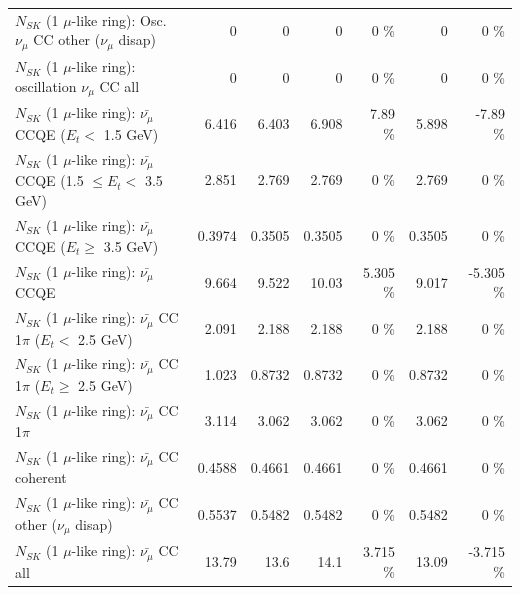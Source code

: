 \begin{table}
\begin{tabular}{| l | r | r | r  r | r  r |}
         $N_{SK}$ (1 $\mu$-like ring): Osc. $\nu_\mu$ CC other ($\nu_\mu$ disap) &               0 &               0 &               0 &        0 \%  &               0 &        0 \%  \\ 
                      $N_{SK}$ (1 $\mu$-like ring): oscillation $\nu_\mu$ CC all &               0 &               0 &               0 &        0 \%  &               0 &        0 \%  \\ 
\hline
\hline
          $N_{SK}$ (1 $\mu$-like ring): $\bar{\nu_\mu}$ CCQE ($E_{t} <$ 1.5 GeV) &           6.416 &           6.403 &           6.908 &     7.89 \%  &           5.898 &    -7.89 \%  \\ 
 $N_{SK}$ (1 $\mu$-like ring): $\bar{\nu_\mu}$ CCQE (1.5 $\leq E_{t} <$ 3.5 GeV) &           2.851 &           2.769 &           2.769 &        0 \%  &           2.769 &        0 \%  \\ 
       $N_{SK}$ (1 $\mu$-like ring): $\bar{\nu_\mu}$ CCQE ($E_{t} \geq$ 3.5 GeV) &          0.3974 &          0.3505 &          0.3505 &        0 \%  &          0.3505 &        0 \%  \\ 
\hline
                              $N_{SK}$ (1 $\mu$-like ring): $\bar{\nu_\mu}$ CCQE &           9.664 &           9.522 &           10.03 &    5.305 \%  &           9.017 &   -5.305 \%  \\ 
\hline
     $N_{SK}$ (1 $\mu$-like ring): $\bar{\nu_\mu}$ CC 1$\pi$ ($E_{t} <$ 2.5 GeV) &           2.091 &           2.188 &           2.188 &        0 \%  &           2.188 &        0 \%  \\ 
  $N_{SK}$ (1 $\mu$-like ring): $\bar{\nu_\mu}$ CC 1$\pi$ ($E_{t} \geq$ 2.5 GeV) &           1.023 &          0.8732 &          0.8732 &        0 \%  &          0.8732 &        0 \%  \\ 
\hline
                         $N_{SK}$ (1 $\mu$-like ring): $\bar{\nu_\mu}$ CC 1$\pi$ &           3.114 &           3.062 &           3.062 &        0 \%  &           3.062 &        0 \%  \\ 
                       $N_{SK}$ (1 $\mu$-like ring): $\bar{\nu_\mu}$ CC coherent &          0.4588 &          0.4661 &          0.4661 &        0 \%  &          0.4661 &        0 \%  \\ 
        $N_{SK}$ (1 $\mu$-like ring): $\bar{\nu_\mu}$ CC other ($\nu_\mu$ disap) &          0.5537 &          0.5482 &          0.5482 &        0 \%  &          0.5482 &        0 \%  \\ 
                          $N_{SK}$ (1 $\mu$-like ring): $\bar{\nu_{\mu}}$ CC all &           13.79 &            13.6 &            14.1 &    3.715 \%  &           13.09 &   -3.715 \%  \\ 

\end{tabular}
\end{table}
